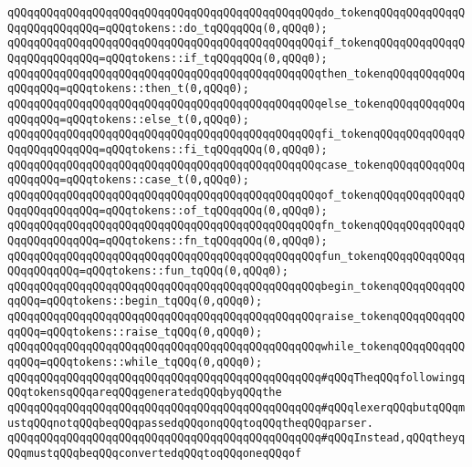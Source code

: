 \newline
\verb|qQQqqQQqqQQqqQQqqQQqqQQqqQQqqQQqqQQqqQQqqQQqqQQqdo_tokenqQQqqQQqqQQqqQQqqQQqqQQqqQQq=qQQqtokens::do_tqQQqqQQq(0,qQQq0);|\newline
\verb|qQQqqQQqqQQqqQQqqQQqqQQqqQQqqQQqqQQqqQQqqQQqqQQqif_tokenqQQqqQQqqQQqqQQqqQQqqQQqqQQq=qQQqtokens::if_tqQQqqQQq(0,qQQq0);|\newline
\verb|qQQqqQQqqQQqqQQqqQQqqQQqqQQqqQQqqQQqqQQqqQQqqQQqthen_tokenqQQqqQQqqQQqqQQqqQQq=qQQqtokens::then_t(0,qQQq0);|\newline
\verb|qQQqqQQqqQQqqQQqqQQqqQQqqQQqqQQqqQQqqQQqqQQqqQQqelse_tokenqQQqqQQqqQQqqQQqqQQq=qQQqtokens::else_t(0,qQQq0);|\newline
\verb|qQQqqQQqqQQqqQQqqQQqqQQqqQQqqQQqqQQqqQQqqQQqqQQqfi_tokenqQQqqQQqqQQqqQQqqQQqqQQqqQQq=qQQqtokens::fi_tqQQqqQQq(0,qQQq0);|\newline
\verb|qQQqqQQqqQQqqQQqqQQqqQQqqQQqqQQqqQQqqQQqqQQqqQQqcase_tokenqQQqqQQqqQQqqQQqqQQq=qQQqtokens::case_t(0,qQQq0);|\newline
\verb|qQQqqQQqqQQqqQQqqQQqqQQqqQQqqQQqqQQqqQQqqQQqqQQqof_tokenqQQqqQQqqQQqqQQqqQQqqQQqqQQq=qQQqtokens::of_tqQQqqQQq(0,qQQq0);|\newline
\newline
\verb|qQQqqQQqqQQqqQQqqQQqqQQqqQQqqQQqqQQqqQQqqQQqqQQqfn_tokenqQQqqQQqqQQqqQQqqQQqqQQqqQQq=qQQqtokens::fn_tqQQqqQQq(0,qQQq0);|\newline
\verb|qQQqqQQqqQQqqQQqqQQqqQQqqQQqqQQqqQQqqQQqqQQqqQQqfun_tokenqQQqqQQqqQQqqQQqqQQqqQQq=qQQqtokens::fun_tqQQq(0,qQQq0);|\newline
\verb|qQQqqQQqqQQqqQQqqQQqqQQqqQQqqQQqqQQqqQQqqQQqqQQqbegin_tokenqQQqqQQqqQQqqQQq=qQQqtokens::begin_tqQQq(0,qQQq0);|\newline
\verb|qQQqqQQqqQQqqQQqqQQqqQQqqQQqqQQqqQQqqQQqqQQqqQQqraise_tokenqQQqqQQqqQQqqQQq=qQQqtokens::raise_tqQQq(0,qQQq0);|\newline
\verb|qQQqqQQqqQQqqQQqqQQqqQQqqQQqqQQqqQQqqQQqqQQqqQQqwhile_tokenqQQqqQQqqQQqqQQq=qQQqtokens::while_tqQQq(0,qQQq0);|\newline
\newline
\verb|qQQqqQQqqQQqqQQqqQQqqQQqqQQqqQQqqQQqqQQqqQQqqQQq#qQQqTheqQQqfollowingqQQqtokensqQQqareqQQqgeneratedqQQqbyqQQqthe|\newline
\verb|qQQqqQQqqQQqqQQqqQQqqQQqqQQqqQQqqQQqqQQqqQQqqQQq#qQQqlexerqQQqbutqQQqmustqQQqnotqQQqbeqQQqpassedqQQqonqQQqtoqQQqtheqQQqparser.|\newline
\verb|qQQqqQQqqQQqqQQqqQQqqQQqqQQqqQQqqQQqqQQqqQQqqQQq#qQQqInstead,qQQqtheyqQQqmustqQQqbeqQQqconvertedqQQqtoqQQqoneqQQqof|\newline

